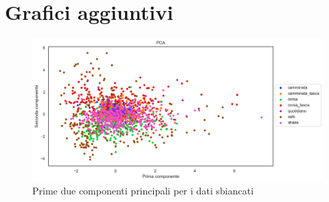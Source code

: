 \documentclass[main.tex]{subfiles}
\begin{document}
\section{Grafici aggiuntivi}
\begin{figure}[H]
	\centering
	\includegraphics[width=.8\textwidth, keepaspectratio]{../../figure/PCA.png}
	\caption{{ Prime due componenti principali per i dati sbiancati}}
	\label{PCA}
\end{figure}
\end{document}
